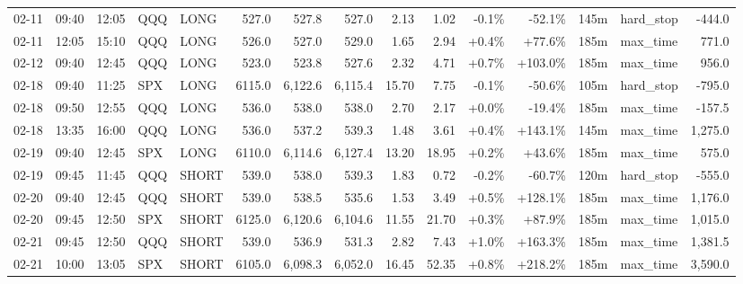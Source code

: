 \documentclass[11pt,a4paper,twoside]{article}
\begin{document}
\begin{landscape}
\begin{center}
\begin{longtable}{>{\color{txtmain}}l l l l l r r r r r r r r >{\color{txtmain}}l r}
02-11 & 09:40 & 12:05 & QQQ & LONG & 527.0 & 527.8 & 527.0 & 2.13 & 1.02 & \textcolor{lossred}{-0.1\%} & \textcolor{lossred}{-52.1\%} & 145m & hard\_stop & \textcolor{lossred}{-444.0} \\
02-11 & 12:05 & 15:10 & QQQ & LONG & 526.0 & 527.0 & 529.0 & 1.65 & 2.94 & \textcolor{wingreen}{+0.4\%} & \textcolor{wingreen}{+77.6\%} & 185m & max\_time & \textcolor{wingreen}{771.0} \\
02-12 & 09:40 & 12:45 & QQQ & LONG & 523.0 & 523.8 & 527.6 & 2.32 & 4.71 & \textcolor{wingreen}{+0.7\%} & \textcolor{wingreen}{+103.0\%} & 185m & max\_time & \textcolor{wingreen}{956.0} \\
02-18 & 09:40 & 11:25 & SPX & LONG & 6115.0 & 6,122.6 & 6,115.4 & 15.70 & 7.75 & \textcolor{lossred}{-0.1\%} & \textcolor{lossred}{-50.6\%} & 105m & hard\_stop & \textcolor{lossred}{-795.0} \\
02-18 & 09:50 & 12:55 & QQQ & LONG & 536.0 & 538.0 & 538.0 & 2.70 & 2.17 & \textcolor{wingreen}{+0.0\%} & \textcolor{lossred}{-19.4\%} & 185m & max\_time & \textcolor{lossred}{-157.5} \\
02-18 & 13:35 & 16:00 & QQQ & LONG & 536.0 & 537.2 & 539.3 & 1.48 & 3.61 & \textcolor{wingreen}{+0.4\%} & \textcolor{wingreen}{+143.1\%} & 145m & max\_time & \textcolor{wingreen}{1,275.0} \\
02-19 & 09:40 & 12:45 & SPX & LONG & 6110.0 & 6,114.6 & 6,127.4 & 13.20 & 18.95 & \textcolor{wingreen}{+0.2\%} & \textcolor{wingreen}{+43.6\%} & 185m & max\_time & \textcolor{wingreen}{575.0} \\
02-19 & 09:45 & 11:45 & QQQ & SHORT & 539.0 & 538.0 & 539.3 & 1.83 & 0.72 & \textcolor{lossred}{-0.2\%} & \textcolor{lossred}{-60.7\%} & 120m & hard\_stop & \textcolor{lossred}{-555.0} \\
02-20 & 09:40 & 12:45 & QQQ & SHORT & 539.0 & 538.5 & 535.6 & 1.53 & 3.49 & \textcolor{wingreen}{+0.5\%} & \textcolor{wingreen}{+128.1\%} & 185m & max\_time & \textcolor{wingreen}{1,176.0} \\
02-20 & 09:45 & 12:50 & SPX & SHORT & 6125.0 & 6,120.6 & 6,104.6 & 11.55 & 21.70 & \textcolor{wingreen}{+0.3\%} & \textcolor{wingreen}{+87.9\%} & 185m & max\_time & \textcolor{wingreen}{1,015.0} \\
02-21 & 09:45 & 12:50 & QQQ & SHORT & 539.0 & 536.9 & 531.3 & 2.82 & 7.43 & \textcolor{wingreen}{+1.0\%} & \textcolor{wingreen}{+163.3\%} & 185m & max\_time & \textcolor{wingreen}{1,381.5} \\
02-21 & 10:00 & 13:05 & SPX & SHORT & 6105.0 & 6,098.3 & 6,052.0 & 16.45 & 52.35 & \textcolor{wingreen}{+0.8\%} & \textcolor{wingreen}{+218.2\%} & 185m & max\_time & \textcolor{wingreen}{3,590.0} \\

\end{longtable}
\end{center}
\end{landscape}
\end{document}
